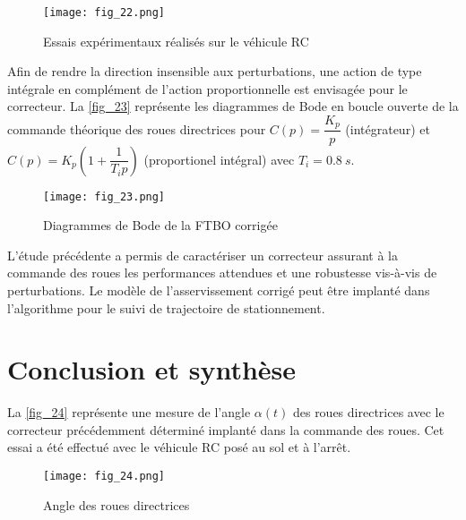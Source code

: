 \begin{figure}[H]
\centering
\texttt{[image: fig\_22.png]}
\caption{Essais expérimentaux réalisés sur le véhicule RC \label{fig_22}}
\end{figure}

\ifprof
\begin{corrige}
\end{corrige}
\else
\fi

Afin de rendre la direction insensible aux perturbations, une action de type intégrale en complément de l’action
proportionnelle est envisagée pour le correcteur. La \autoref{fig_23} représente les diagrammes de Bode en boucle ouverte de la commande théorique des roues directrices pour $C(p)=\dfrac{K_p}{p}$ 
(intégrateur) et $C(p)=K_p\left(1+\dfrac{1}{T_i p}\right)$ (proportionel intégral) avec $T_i = \SI{0,8}{s}$.

\begin{figure}[H]
\centering
\texttt{[image: fig\_23.png]}
\caption{Diagrammes de Bode de la FTBO corrigée \label{fig_23}}
\end{figure}

\ifprof
\begin{corrige}
\end{corrige}
\else
\fi

L’étude précédente a permis de caractériser un correcteur assurant à la commande des roues les performances
attendues et une robustesse vis-à-vis de perturbations. Le modèle de l’asservissement corrigé peut être implanté
dans l’algorithme pour le suivi de trajectoire de stationnement.


\section{Conclusion et synthèse}

La \autoref{fig_24} représente une mesure de l’angle $\alpha(t)$ des roues directrices avec le correcteur précédemment déterminé implanté dans la commande des roues. Cet essai a été effectué avec le véhicule RC posé au sol et à l’arrêt.

\begin{figure}[H]
\centering
\texttt{[image: fig\_24.png]}
\caption{Angle des roues directrices \label{fig_24}}
\end{figure}

